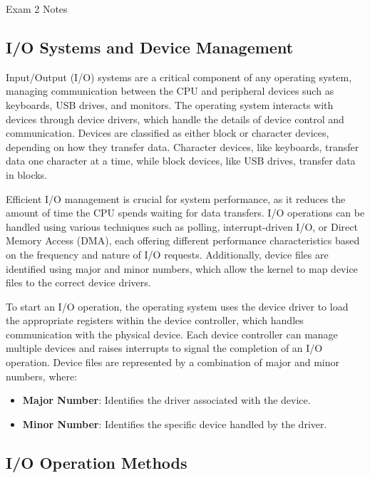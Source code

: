 \begin{examnotes}{Exam 2 Notes}
    \subsection*{I/O Systems and Device Management}

    Input/Output (I/O) systems are a critical component of any operating system, managing communication between the CPU and peripheral devices such as keyboards, USB drives, and monitors. The operating 
    system interacts with devices through device drivers, which handle the details of device control and communication. Devices are classified as either block or character devices, depending on how they 
    transfer data. Character devices, like keyboards, transfer data one character at a time, while block devices, like USB drives, transfer data in blocks.
    
    Efficient I/O management is crucial for system performance, as it reduces the amount of time the CPU spends waiting for data transfers. I/O operations can be handled using various techniques such as 
    polling, interrupt-driven I/O, or Direct Memory Access (DMA), each offering different performance characteristics based on the frequency and nature of I/O requests. Additionally, device files are 
    identified using major and minor numbers, which allow the kernel to map device files to the correct device drivers.
    
    \begin{highlight}
        To start an I/O operation, the operating system uses the device driver to load the appropriate registers within the device controller, which handles communication with the physical device. Each 
        device controller can manage multiple devices and raises interrupts to signal the completion of an I/O operation. Device files are represented by a combination of major and minor numbers, where:
        \begin{itemize}
            \item \textbf{Major Number}: Identifies the driver associated with the device.
            \item \textbf{Minor Number}: Identifies the specific device handled by the driver.
        \end{itemize}
    \end{highlight}
    
    \subsection*{I/O Operation Methods}
    

\end{examnotes}
